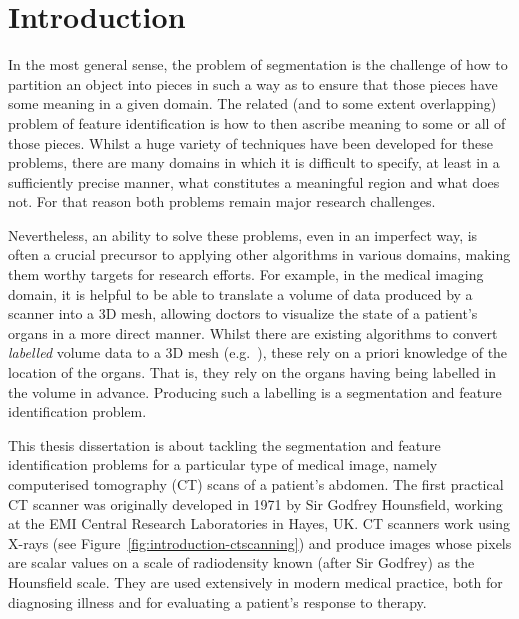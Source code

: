 \chapter{Introduction}
\label{chap:introduction}


In the most general sense, the problem of segmentation is the challenge of how to partition an object into pieces in such a way as to ensure that those pieces have some meaning in a given domain. The related (and to some extent overlapping) problem of feature identification is how to then ascribe meaning to some or all of those pieces. Whilst a huge variety of techniques have been developed for these problems, there are many domains in which it is difficult to specify, at least in a sufficiently precise manner, what constitutes a meaningful region and what does not. For that reason both problems remain major research challenges.

Nevertheless, an ability to solve these problems, even in an imperfect way, is often a crucial precursor to applying other algorithms in various domains, making them worthy targets for research efforts. For example, in the medical imaging domain, it is helpful to be able to translate a volume of data produced by a scanner into a 3D mesh, allowing doctors to visualize the state of a patient's organs in a more direct manner. Whilst there are existing algorithms to convert \emph{labelled} volume data to a 3D mesh (e.g.~\cite{wu03}), these rely on a priori knowledge of the location of the organs. That is, they rely on the organs having being labelled in the volume in advance. Producing such a labelling is a segmentation and feature identification problem.

This thesis dissertation is about tackling the segmentation and feature identification problems for a particular type of medical image, namely computerised tomography (CT) scans of a patient's abdomen. The first practical CT scanner was originally developed in 1971 by Sir Godfrey Hounsfield, working at the EMI Central Research Laboratories in Hayes, UK. CT scanners work using X-rays (see Figure~\ref{fig:introduction-ctscanning}) and produce images whose pixels are scalar values on a scale of radiodensity known (after Sir Godfrey) as the Hounsfield scale. They are used extensively in modern medical practice, both for diagnosing illness and for evaluating a patient's response to therapy.


